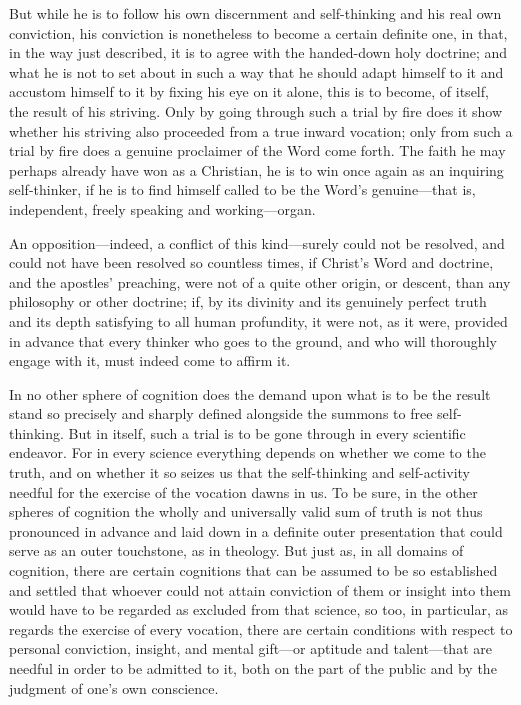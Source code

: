 \documentclass[12pt,a4paper]{book}
\begin{document}
But while he is to follow his own discernment and self-thinking and his real own conviction, his
conviction is nonetheless to become a certain definite one, in that, in the way just described, it
is to agree with the handed-down holy doctrine; and what he is not to set about in such a way that
he should adapt himself to it and accustom himself to it by fixing his eye on it alone, this is to
become, of itself, the result of his striving. Only by going through such a trial by fire does it
show whether his striving also proceeded from a true inward vocation; only from such a trial by
fire does a genuine proclaimer of the Word come forth. The faith he may perhaps already have won as
a Christian, he is to win once again as an inquiring self-thinker, if he is to find himself called
to be the Word's genuine---that is, independent, freely speaking and working---organ.

An opposition---indeed, a conflict of this kind---surely could not be resolved, and could not have
been resolved so countless times, if Christ's Word and doctrine, and the apostles' preaching, were
not of a quite other origin, or descent, than any philosophy or other doctrine; if, by its
divinity and its genuinely perfect truth and its depth satisfying to all human profundity, it were
not, as it were, provided in advance that every thinker who goes to the ground, and who will
thoroughly engage with it, must indeed come to affirm it.

In no other sphere of cognition does the demand upon what is to be the result stand so precisely
and sharply defined alongside the summons to free self-thinking. But in itself, such a trial is to
be gone through in every scientific endeavor. For in every science everything depends on whether we
come to the truth, and on whether it so seizes us that the self-thinking and self-activity needful
for the exercise of the vocation dawns in us. To be sure, in the other spheres of cognition the
wholly and universally valid sum of truth is not thus pronounced in advance and laid down in a
definite outer presentation that could serve as an outer touchstone, as in theology. But just as,
in all domains of cognition, there are certain cognitions that can be assumed to be so established and
settled that whoever could not attain conviction of them or insight into them would have to be
regarded as excluded from that science, so too, in particular, as regards the exercise of every
vocation, there are certain conditions with respect to personal conviction, insight, and mental
gift---or aptitude and talent---that are needful in order to be admitted to it, both on the part of
the public and by the judgment of one's own conscience.
\end{document}
